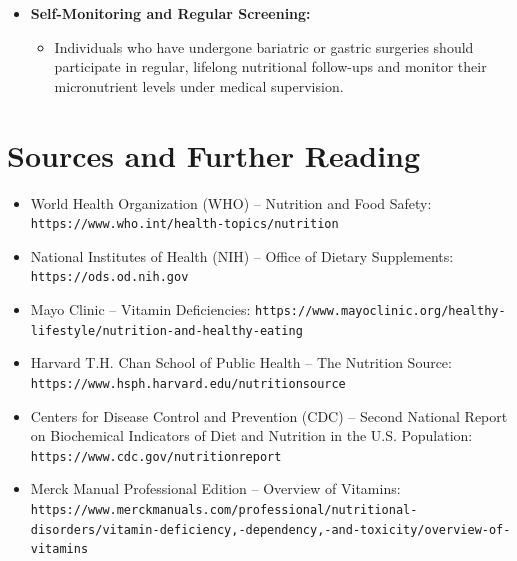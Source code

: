 \begin{itemize}
    \item \textbf{Self-Monitoring and Regular Screening:}
    \begin{itemize}
        \item Individuals who have undergone bariatric or gastric surgeries should participate in regular, lifelong nutritional follow-ups and monitor their micronutrient levels under medical supervision.
    \end{itemize}
\end{itemize}

\section*{Sources and Further Reading}
\begin{itemize}
    \item World Health Organization (WHO) -- Nutrition and Food Safety: \texttt{https://www.who.int/health-topics/nutrition}
    \item National Institutes of Health (NIH) -- Office of Dietary Supplements: \texttt{https://ods.od.nih.gov}
    \item Mayo Clinic -- Vitamin Deficiencies: \texttt{https://www.mayoclinic.org/healthy-lifestyle/nutrition-and-healthy-eating}
    \item Harvard T.H. Chan School of Public Health -- The Nutrition Source: \texttt{https://www.hsph.harvard.edu/nutritionsource}
    \item Centers for Disease Control and Prevention (CDC) -- Second National Report on Biochemical Indicators of Diet and Nutrition in the U.S. Population: \texttt{https://www.cdc.gov/nutritionreport}
    \item Merck Manual Professional Edition -- Overview of Vitamins: \texttt{https://www.merckmanuals.com/professional/nutritional-disorders/vitamin-deficiency,-dependency,-and-toxicity/overview-of-vitamins}
\end{itemize}